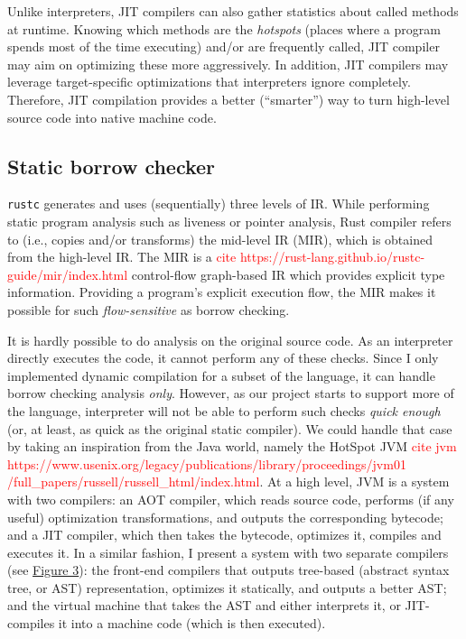 Unlike interpreters, JIT compilers can also gather statistics about
called methods at runtime. Knowing which methods are the \textit{hotspots} (places
where a program spends most of the time executing) and/or are frequently called,
JIT compiler may aim on optimizing these more aggressively. In addition,
JIT compilers may leverage target-specific optimizations that interpreters 
ignore completely. Therefore, JIT compilation provides a better (``smarter'')
way to turn high-level source code into native machine code.

%

\subsection{Static borrow checker}

\texttt{rustc} generates and uses (sequentially) three levels of IR. While
performing static program analysis such as liveness or pointer analysis, Rust
compiler refers to (i.e., copies and/or transforms) the mid-level IR (MIR),
which is obtained from the high-level IR. The MIR is a \textcolor{red}{ cite
https://rust-lang.github.io/rustc-guide/mir/index.html}  control-flow
graph-based IR which provides explicit type information. Providing a program's
explicit execution flow, the MIR makes it possible for such
\textit{flow-sensitive} as borrow checking.

It is hardly possible to do analysis on the original source code. As an
interpreter directly executes the code, it cannot perform any of these checks.
Since I only implemented dynamic compilation for a subset of the language, it
can handle borrow checking analysis \textit{only}. However, as our project
starts to support more of the language, interpreter will not be able to perform
such checks \textit{quick enough} (or, at least, as quick as the original
static compiler).  We could handle that case by taking an inspiration from the
Java world, namely the HotSpot JVM \textcolor{red}{cite jvm
https://www.usenix.org/legacy/publications/library/proceedings/jvm01
/full\_papers/russell/russell\_html/index.html}. At a high level, JVM is a
system with two compilers: an AOT compiler, which reads source code, performs
(if any useful) optimization transformations, and outputs the corresponding
bytecode; and a JIT compiler, which then takes the bytecode, optimizes it,
compiles and executes it. In a similar fashion, I present a system with two
separate compilers (see \hyperref[arch1]{Figure 3}): the front-end compilers
that outputs tree-based (abstract syntax tree, or AST) representation,
optimizes it statically, and outputs a better AST; and the virtual machine that
takes the AST and either interprets it, or JIT-compiles it into a machine code
(which is then executed).

